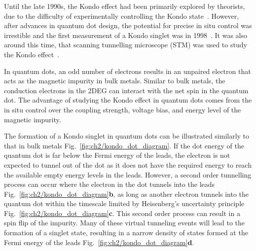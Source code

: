 Until the late 1990s, the Kondo effect had been primarily explored by theorists, due to the difficulty of experimentally controlling the Kondo state~\cite{kondo_review}. However, after advances in quantum dot design, the potential for precise in situ control was irrestible and the first measurement of a Kondo singlet was in 1998~\cite{goldhaber_first_kondo}. It was also around this time, that scanning  tunnelling microscope (STM) was used to study the Kondo effect~\cite{stm_kondo}.

In quantum dots, an odd number of electrons results in an unpaired electron that acts as the magnetic impurity in bulk metals. Similar to bulk metals, the conduction electrons in the 2DEG can interact with the net spin in the quantum dot. The advantage of studying the Kondo effect in quantum dots comes from the in situ control over the coupling strength, voltage bias, and energy level of the magnetic impurity.

The formation of a Kondo singlet in quantum dots can be illustrated similarly to that in bulk metals Fig.~\ref{fig:ch2/kondo_dot_diagram}. 
If the dot energy of the quantum dot is far below the Fermi energy of the leads, the electron is not expected to tunnel out of the dot as it does not have the required energy to reach the available empty energy levels in the leads. However, a second order tunnelling process can occur where the electron in the dot tunnels into the leads Fig.~\ref{fig:ch2/kondo_dot_diagram}\textbf{b}, as long as another electron tunnels into the quantum dot within the timescale limited by Heisenberg’s uncertainty principle Fig.~\ref{fig:ch2/kondo_dot_diagram}\textbf{c}. This second order process can result in a spin flip of the impurity. Many of these virtual tunneling events will lead to the formation of a singlet state, resulting in a narrow density of states formed at the Fermi energy of the leads Fig.~\ref{fig:ch2/kondo_dot_diagram}\textbf{d}. 


